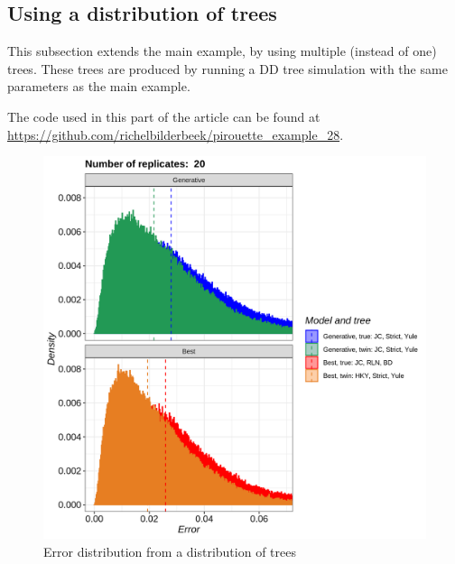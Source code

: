 



\subsection{Using a distribution of trees}
\label{subsec:distribution}

This subsection extends the main example, by using multiple (instead of
one) trees. These trees are produced by running a DD tree simulation
with the same parameters as the main example.

The code used in this part of the article can be found at 
\url{https://github.com/richelbilderbeek/pirouette_example_28}.

\begin{figure}[H]
  \includegraphics[width=\textwidth]{pirouette_example_28/errors.png}
  \caption{Error distribution from a distribution of trees}
\end{figure}


